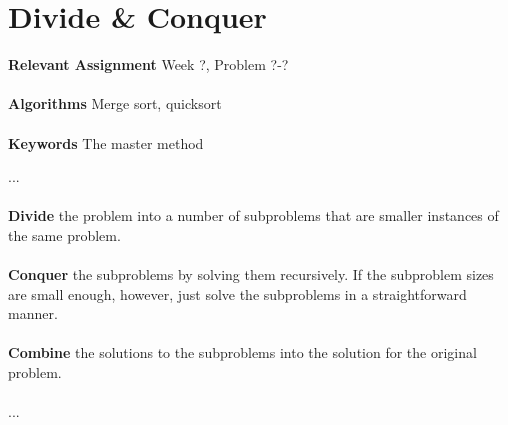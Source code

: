 
\chapter{Divide \& Conquer}
\label{ch:divideandconquer}

\textbf{Relevant Assignment} Week ?, Problem ?-?\\\\
\textbf{Algorithms} Merge sort, quicksort\\\\
\textbf{Keywords} The master method
\vspace{1in}

\noindent ...
\\\\
\noindent \textbf{Divide} the problem into a number of subproblems that are
smaller instances of the same problem.
\\\\
\noindent \textbf{Conquer} the subproblems by solving them recursively. If the
subproblem sizes are small enough, however, just solve the subproblems in a
straightforward manner.
\\\\
\noindent \textbf{Combine} the solutions to the subproblems into the solution
for the original problem.
\\\\
...

